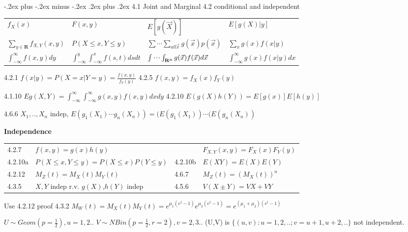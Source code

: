 \documentclass[10pt,landscape]{article}
\makeatletter
\renewcommand{\subsubsection}{\@startsection{subsubsection}{3}{0mm}%
                                {-.2ex plus -.2ex minus -.2ex}%
                                {.2ex plus .2ex}%
                                {\normalfont\small\bfseries}}
\makeatother
\begin{document}
\raggedright
\footnotesize
\begin{multicols}{1}


\setlength{\premulticols}{1pt}
\setlength{\postmulticols}{1pt}
\setlength{\multicolsep}{1pt}
\setlength{\columnsep}{2pt}



\subsubsection{4.1 Joint and Marginal 4.2 conditional and independent}
\begin{tabular}{l|l|l|l}
$f_X(x)$   & $F(x,y)$ & $E[g(\vec X)]$ & $E[g(X)|y]$ \\
$\sum_{y\in\mathbf{R}}f_{X,Y}(x,y)$ & $P(X\le x, Y\le y)$ & $\sum\cdots\sum_{all\vec x} g(\vec x)p(\vec x)$ & $\sum_xg(x)f(x|y)$\\
$\int_{-\infty}^{\infty}f(x,y)dy$ & $\int_{-\infty}^{y}\int_{-\infty}^{x}f(s,t)dsdt$ & $\idotsint_{\mathbf{R^n}}g(\vec x)f(\vec x)d\vec x$ & $\int_{-\infty}^{\infty}g(x)f(x|y)dx$
\end{tabular}

4.2.1 $f(x|y)=P(X=x|Y=y)=\frac{f(x,y)}{f_Y(y)}$ 4.2.5 $f(x,y)=f_X(x)f_Y(y)$

4.1.10 $Eg(X,Y)=\int_{-\infty}^{\infty}\int_{-\infty}^{\infty} g(x,y)f(x,y)dxdy$ 4.2.10 $E(g(X)h(Y))=E[g(x)]E[h(y)]$

4.6.6 $X_1,.., X_n$ indep, $E(g_1(X_1)\cdots g_n(X_n))=(E(g_1(X_1))\cdots(E(g_n(X_n))$

\textbf{Independence}

\begin{tabular}{l|l|l|l}
4.2.7   & $f(x,y)=g(x)h(y)$ & & $F_{X,Y}(x,y)=F_X(x)F_Y(y)$\\
4.2.10a & $P(X\le x,Y\le y)=P(X\le x)P(Y\le y)$ & 4.2.10b & $E(XY)=E(X)E(Y)$\\
4.2.12 & $M_Z(t)=M_X(t)M_Y(t)$ & 4.6.7 & $M_Z(t)=(M_X(t))^n$ \\
4.3.5 & $X,Y$ indep r.v. $g(X)$,$h(Y)$ indep & 4.5.6 & $V(X\pm Y) =VX+VY$ 
\end{tabular}

Use 4.2.12 proof 4.3.2 $M_W(t)=M_X(t)M_Y(t)=e^{\mu_1(e^t-1)}e^{\mu_2(e^t-1)}=e^{(\mu_1+\mu_2)(e^t-1)}$

$U\sim Geom(p=\frac12),u=1,2..$ $V\sim N Bin(p=\frac12,r=2),v=2,3..$ (U,V) is $\{(u,v):u=1,2,..;v=u+1,u+2,..\}$ not independent.


\end{multicols}
\end{document}

